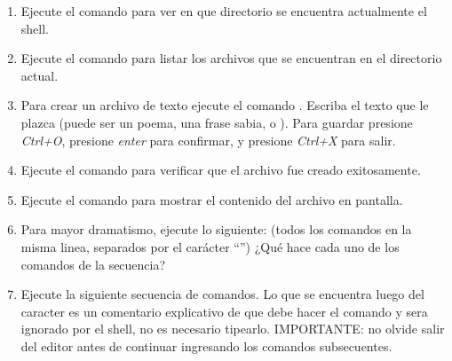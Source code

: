 \documentclass[12pt]{article}
\begin{document}
\begin{enumerate}[resume]

    \item Ejecute el comando  para ver en que directorio se encuentra
        actualmente el shell.

    \item Ejecute el comando  para listar los archivos que se
        encuentran en el directorio actual.

    \item Para crear un archivo de texto ejecute el comando . Escriba el texto que le plazca (puede ser un poema, una
        frase sabia, o ). Para guardar presione \emph{Ctrl+O},
        presione \emph{enter} para confirmar, y presione \emph{Ctrl+X} para
        salir.

    \item Ejecute el comando  para verificar que el archivo fue creado
        exitosamente.

    \item Ejecute el comando  para mostrar el contenido
        del archivo en pantalla.

    \item Para mayor dramatismo, ejecute lo siguiente:  (todos los comandos en la misma linea, separados
        por el carácter ``\cw{|}'') ¿Qué hace cada uno de los comandos de la
        secuencia?

    \item Ejecute la siguiente secuencia de comandos. Lo que se encuentra
        luego del caracter \cw{\#} es un comentario explicativo de que debe
        hacer el comando y sera ignorado por el shell, no es necesario
        tipearlo. IMPORTANTE: no olvide salir del editor  antes de
        continuar ingresando los comandos subsecuentes.

    \begin{center}


\end{center}
\end{enumerate}
\end{document}
